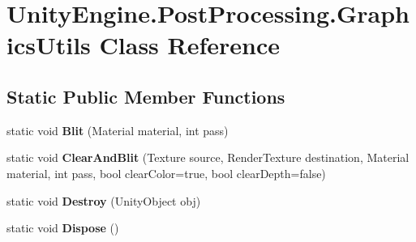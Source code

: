 \hypertarget{class_unity_engine_1_1_post_processing_1_1_graphics_utils}{}\section{Unity\+Engine.\+Post\+Processing.\+Graphics\+Utils Class Reference}
\label{class_unity_engine_1_1_post_processing_1_1_graphics_utils}
\subsection*{Static Public Member Functions}
\begin{DoxyCompactItemize}
\item 
\mbox{\label{class_unity_engine_1_1_post_processing_1_1_graphics_utils_ac4809219f9502267065e855e62dd64de}} 
static void {\bfseries Blit} (Material material, int pass)
\item 
\mbox{\label{class_unity_engine_1_1_post_processing_1_1_graphics_utils_a87526dc05f6c55d88a1bb47c614b250d}} 
static void {\bfseries Clear\+And\+Blit} (Texture source, Render\+Texture destination, Material material, int pass, bool clear\+Color=true, bool clear\+Depth=false)
\item 
\mbox{\label{class_unity_engine_1_1_post_processing_1_1_graphics_utils_a33ab867d673af33b801d7e6edafaa8e7}} 
static void {\bfseries Destroy} (Unity\+Object obj)
\item 
\mbox{\label{class_unity_engine_1_1_post_processing_1_1_graphics_utils_a05480dd987f0e42c01bae89f26bad4b8}} 
static void {\bfseries Dispose} ()
\end{DoxyCompactItemize}
